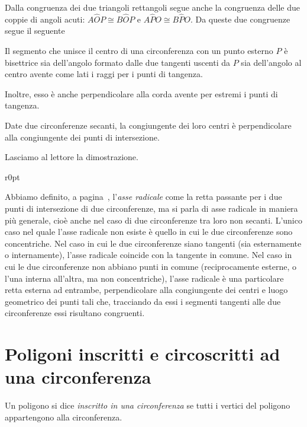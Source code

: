 Dalla congruenza dei due triangoli rettangoli segue anche la congruenza delle due coppie di angoli acuti: $A\widehat{O}P\cong B\widehat{O}P$ e $A\widehat{P}O\cong B\widehat{P}O$. Da queste due congruenze segue il seguente 
\begin{corollario}\label{cor:5.1}
Il segmento che unisce il centro di una circonferenza con un punto esterno $P$ è bisettrice sia dell'angolo formato dalle due tangenti uscenti da $P$ sia dell'angolo al centro avente come lati i raggi per i punti di tangenza.
\end{corollario}
Inoltre, esso è anche perpendicolare alla corda avente per estremi i punti di tangenza.

\begin{corollario}
Date due circonferenze secanti, la congiungente dei loro centri è perpendicolare alla congiungente dei punti di intersezione.
\end{corollario}

Lasciamo al lettore la dimostrazione.

\begin{wrapfigure}{r}{0pt}
	\centering
\end{wrapfigure}
Abbiamo definito, a pagina~\pageref{def:asse_radicale}, l'\emph{asse radicale} come la retta passante per i due punti di intersezione di due circonferenze, ma si parla di asse radicale in maniera più generale, cioè anche nel caso di due circonferenze tra loro non secanti. L'unico caso nel quale l'asse radicale non esiste è quello in cui le due circonferenze sono concentriche.
Nel caso in cui le due circonferenze siano tangenti (sia esternamente o internamente), l'asse radicale coincide con la tangente in comune.
Nel caso in cui le due circonferenze non abbiano punti in comune (reciprocamente esterne, o l'una interna all'altra, ma non concentriche), l'asse radicale è una particolare retta esterna ad entrambe, perpendicolare alla congiungente dei centri e luogo geometrico dei punti tali che, tracciando da essi i segmenti tangenti alle due circonferenze essi risultano congruenti.


\section{Poligoni inscritti e circoscritti ad una circonferenza}\label{sect:poligoni_circonferenza}

\begin{definizione}
Un poligono si dice \emph{inscritto in una circonferenza} se tutti i vertici del poligono appartengono alla circonferenza.
\end{definizione}

